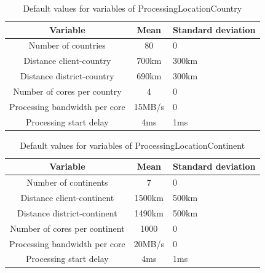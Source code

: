 \begin{table}[H]
\centering
\begin{tabular}{|c|c|l|}
\rowcolor{bluepoli!40} %
\hline
\textbf{Variable}               & \textbf{Mean}   & \textbf{Standard deviation}   \\ \hline \hline
Number of countries             & 80              & 0                             \\ \hline
Distance client-country         & 700km           & 300km                         \\ \hline
Distance district-country       & 690km           & 300km                         \\ \hline
Number of cores per country     & 4               & 0                             \\ \hline
Processing bandwidth per core   & 15MB/s          & 0                             \\ \hline
Processing start delay          & 4ms             & 1ms                           \\ \hline
\end{tabular}
\caption{Default values for variables of ProcessingLocationCountry}
\label{tab:default_setting_country}
\end{table}

\begin{table}[H]
\centering
\begin{tabular}{|c|c|l|}
\rowcolor{bluepoli!40} %
\hline
\textbf{Variable}               & \textbf{Mean}   & \textbf{Standard deviation}   \\ \hline \hline
Number of continents            & 7               & 0                             \\ \hline
Distance client-continent       & 1500km          & 500km                         \\ \hline
Distance district-continent     & 1490km          & 500km                         \\ \hline
Number of cores per continent   & 1000            & 0                             \\ \hline
Processing bandwidth per core   & 20MB/s          & 0                             \\ \hline
Processing start delay          & 4ms             & 1ms                           \\ \hline
\end{tabular}
\caption{Default values for variables of ProcessingLocationContinent}
\label{tab:default_setting_continent}
\end{table}

